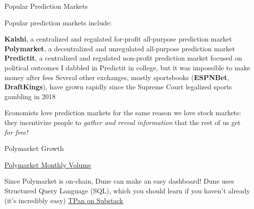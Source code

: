 \documentclass[aspectratio=169]{beamer}
\begin{document}
\begin{frame}{Popular Prediction Markets}

Popular prediction markets include: %

\bi 
\m \textbf{Kalshi}, a centralized and regulated for-profit all-purpose prediction market 
\m \textbf{Polymarket}, a decentralized and unregulated all-purpose prediction market 
\m \textbf{Predictit}, a centralized and regulated non-profit prediction market focused on political outcomes 
\bi 
\m I dabbled in Predictit in college, but it was impossible to make money after fees 
\ei 
\m Several other exchanges, mostly sportsbooks (\textbf{ESPNBet}, \textbf{DraftKings}), have grown rapidly since the Supreme Court legalized sports gambling in 2018 \pause 
\ei 

Economists love prediction markets for the same reason we love stock markets: they incentivize people to \emph{gather and reveal information} that the rest of us get \emph{for free!}

\end{frame}

\begin{frame}{Polymarket Growth}

\begin{center}
    \href{https://dune.com/queries/3996727/6732246}{Polymarket Monthly Volume}
\end{center}

\bi
\m Since Polymarket is on-chain, Dune can make an easy dashboard! 
\m Dune uses Structured Query Language (SQL), which you should learn if you haven't already (it's incredibly easy) 
\m \href{https://tpan.substack.com/p/381-the-grand-integration-of-prediction}{TPan on Substack}
\ei 
    
\end{frame}
\end{document}
